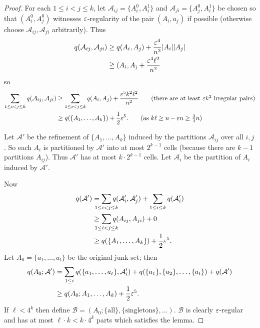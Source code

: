 \documentclass[main.tex]{subfiles}
\begin{document}
\begin{proof}
  For each $1\leq i < j\leq k$, let $\mathcal A_{ij} = \{A_i^0, A_i^1\}$ and
  $\mathcal A_{ji} = \{A_j^0, A_i^1\}$ be chosen so that $(A_i^0, A_j^0)$
  witnesses $\varepsilon$-regularity of the pair $(A_i,a_j)$ if possible (otherwise
  choose $\mathcal A_{ij}, \mathcal A_{ji}$ arbitrarily).
  Thus
  \begin{align*}
    q(\mathcal A_{ij}, \mathcal A_{ji})
    &\geq q(A_i,A_j) + \frac{\varepsilon^4}{n^2}|A_i||A_j| \\
    &\geqq(A_i,A_) + \frac{\varepsilon^4\ell^2}{n^2}
  \end{align*}
  so
  \begin{align*}
    \sum_{1\leq i < j\leq k} q(\mathcal A_{ij}, \mathcal A_{ji})
    &\geq\sum_{1\leq i < j\leq k}q(A_i,A_j) + \frac{\eps^5k^2\ell^2}{n^2}
      \tag{there are at least $\eps k^2$ irregular pairs} \\
    &\geq q(\{A_1,\ldots,A_k\}) + \half\eps^5.
    \tag{as $k\ell\geq n - \eps n\geq\frac 3 4 n$}
  \end{align*}

  Let $\mathcal A'$ be the refinement of $\{A_1,\ldots,A_k\}$ induced by
  the partitions $\mathcal A_{ij}$ over all $i,j$.
  So each $A_i$ is partitioned by $\mathcal A'$ into at most $2^{k-1}$ cells
  (because there are $k-1$ partitions $A_{ij}$).
  Thus $\mathcal A'$ has at most $k\cdot 2^{k-1}$ cells.
  Let $\mathcal A_i$ be the partition of $A_i$ induced by $\mathcal A'$.

  Now
  \begin{align*}
    q(\mathcal A') &= \sum_{\mathclap{1\leq i < j\leq k}} q(\mathcal A_i', \mathcal A_j')
              + \sum_{1\leq i\leq k} q(\mathcal A_i') \\
                   &\geq\sum_{\mathclap{1\leq i< j\leq k}} q(A_{ij},A_{ji}) + 0 \\
                   &\geq q(\{A_1,\ldots,A_k\}) + \half\eps^5.
  \end{align*}
  Let $A_0 = \{a_1,\ldots,a_t\}$ be the original junk set; then
  \begin{align*}
    q(A_0;\mathcal A')
    &= \sum_{1\leq i} q(\{a_1,\ldots,a_t\},\mathcal A_i')
    + q(\{a_1\},\{a_2\},\ldots,\{a_t\}) + q(\mathcal A') \\
    &\geq q(A_0; A_1,\ldots,A_k) + \frac{1}{2}\varepsilon^5.
  \end{align*}
  If $\ell < 4^k$ then define
  $\mathcal B = (A_0; \{\text{all}\}, \{\text{singletons}\},\ldots)$.
  $\mathcal B$ is clearly $\varepsilon$-regular and has at most
  $\ell\cdot k < k\cdot 4^k$ parts which satisfies the lemma.


\end{proof}
\end{document}
